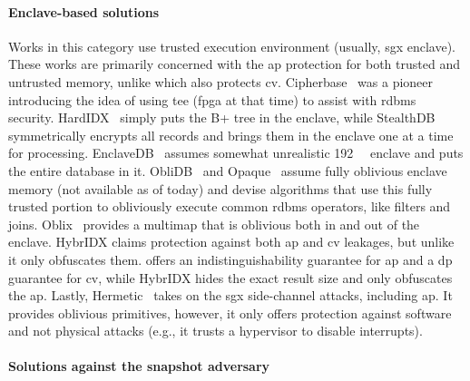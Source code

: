 		\paragraph*{Enclave-based solutions}

			Works in this category use trusted execution environment (usually, \acrshort{sgx} enclave).
			These works are primarily concerned with the \acrshort{ap} protection for both trusted and untrusted memory, unlike \epsolute{} which also protects \acrshort{cv}.
			Cipherbase~\cite{cipherbase-daas} was a pioneer introducing the idea of using \acrshort{tee} (\acrshort{fpga} at that time) to assist with \acrshort{rdbms} security.
			HardIDX~\cite{hardidx} simply puts the B+ tree in the enclave, while StealthDB~\cite{stealth-db} symmetrically encrypts all records and brings them in the enclave one at a time for processing.
			EnclaveDB~\cite{enclave-db} assumes somewhat unrealistic \SI{192}{\giga\byte} enclave and puts the entire database in it.
			ObliDB~\cite{oblidb} and Opaque~\cite{opaque} assume fully oblivious enclave memory (not available as of today) and devise algorithms that use this fully trusted portion to obliviously execute common \acrshort{rdbms} operators, like filters and joins.
			Oblix~\cite{oblix} provides a multimap that is oblivious both in and out of the enclave.
			HybrIDX claims protection against both \acrshort{ap} and \acrshort{cv} leakages, but unlike \epsolute{} it only obfuscates them.
			\epsolute{} offers an indistinguishability guarantee for \acrshort{ap} and a \acrshort{dp} guarantee for \acrshort{cv}, while HybrIDX hides the exact result size and only obfuscates the \acrshort{ap}.
			Lastly, Hermetic~\cite{hermetic} takes on the \acrshort{sgx} side-channel attacks, including \acrshort{ap}.
			It provides oblivious primitives, however, it only offers protection against software and not physical attacks (e.g., it trusts a hypervisor to disable interrupts).

		\paragraph*{Solutions against the snapshot adversary}

